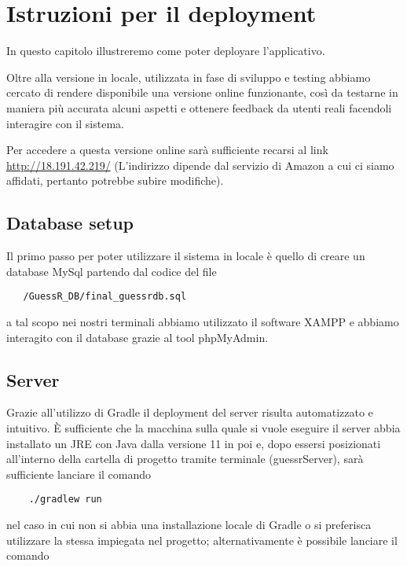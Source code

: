 \section{Istruzioni per il deployment}
In questo capitolo illustreremo come poter deployare l'applicativo.\newline

\noindent Oltre alla versione in locale, utilizzata in fase di sviluppo e testing abbiamo cercato di rendere disponibile una versione online funzionante, così da testarne in maniera più accurata alcuni aspetti e ottenere feedback da utenti reali facendoli interagire con il sistema. \newline

\noindent Per accedere a questa versione online sarà sufficiente recarsi al link \url{http://18.191.42.219/} (L'indirizzo dipende dal servizio di Amazon a cui ci siamo affidati, pertanto potrebbe subire modifiche).

\subsection{Database setup}
Il primo passo per poter utilizzare il sistema in locale è quello di creare un database MySql partendo dal codice del file

\begin{verbatim}
   /GuessR_DB/final_guessrdb.sql
\end{verbatim}

\noindent a tal scopo nei nostri terminali abbiamo utilizzato il software XAMPP e abbiamo interagito con il database grazie al tool phpMyAdmin.

\subsection{Server}
Grazie all'utilizzo di Gradle il deployment del server risulta automatizzato e intuitivo. È sufficiente che la macchina sulla quale si vuole eseguire il server abbia installato un JRE con Java dalla versione 11 in poi e, dopo essersi posizionati all'interno della cartella di progetto tramite terminale (guessrServer), sarà sufficiente lanciare il comando

\begin{verbatim}
    ./gradlew run
\end{verbatim}

\noindent nel caso in cui non si abbia una installazione locale di Gradle o si preferisca utilizzare la stessa impiegata nel progetto; alternativamente è possibile lanciare il comando

